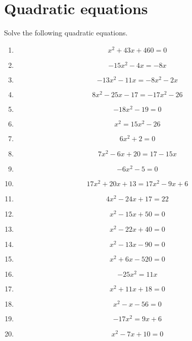 \documentclass{article}
\begin{document}
        \section{Quadratic equations}
        Solve the following quadratic equations.
        \begin{multicols}{1}
        \begin{enumerate}
        \item $$x^{2} + 43 x + 460 = 0$$
\item $$- 15 x^{2} - 4 x = - 8 x$$
\item $$- 13 x^{2} - 11 x = - 8 x^{2} - 2 x$$
\item $$8 x^{2} - 25 x - 17 = - 17 x^{2} - 26$$
\item $$- 18 x^{2} - 19 = 0$$
\item $$x^{2} = 15 x^{2} - 26$$
\item $$6 x^{2} + 2 = 0$$
\item $$7 x^{2} - 6 x + 20 = 17 - 15 x$$
\item $$- 6 x^{2} - 5 = 0$$
\item $$17 x^{2} + 20 x + 13 = 17 x^{2} - 9 x + 6$$
\item $$4 x^{2} - 24 x + 17 = 22$$
\item $$x^{2} - 15 x + 50 = 0$$
\item $$x^{2} - 22 x + 40 = 0$$
\item $$x^{2} - 13 x - 90 = 0$$
\item $$x^{2} + 6 x - 520 = 0$$
\item $$- 25 x^{2} = 11 x$$
\item $$x^{2} + 11 x + 18 = 0$$
\item $$x^{2} - x - 56 = 0$$
\item $$- 17 x^{2} = 9 x + 6$$
\item $$x^{2} - 7 x + 10 = 0$$
        \end{enumerate}
        \end{multicols}
        
\end{document}
